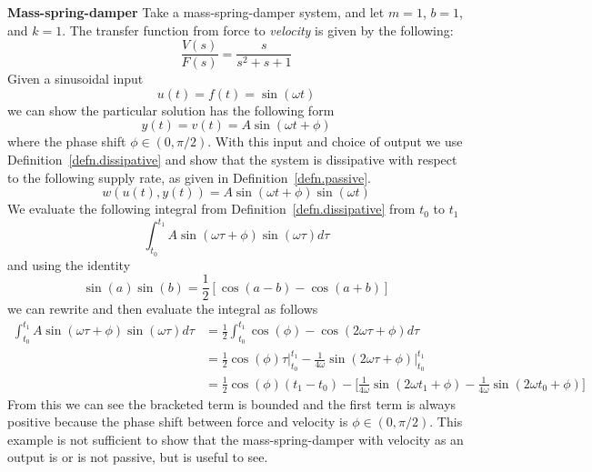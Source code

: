\begin{example}
  \textbf{Mass-spring-damper}
  Take a mass-spring-damper system, and let $m=1$, $b=1$, and $k=1$.
  The transfer function from force to \textit{velocity} is given by the following:
  \begin{equation*}
    \frac{V(s)}{F(s)} = \frac{s}{s^{2}+s+1}
  \end{equation*}
  Given a sinusoidal input
  \begin{equation}
    \label{eqn.sinusoidalInput}
    u(t) = f(t) = \sin(\omega t)
  \end{equation}
  we can show the particular solution has the following form
  \begin{equation}
    \label{eqn.particularSolution}
    y(t) = v(t) = A\sin(\omega t + \phi)
  \end{equation}
  where the phase shift $\phi\in(0, \pi/2)$.
  With this input and choice of output we use Definition~\ref{defn.dissipative} and show that the system is dissipative with respect to the following supply rate, as given in Definition~\ref{defn.passive}.
  \begin{equation}
    \label{eqn.exSupplyRate}
    w(u(t),y(t)) = A\sin(\omega t + \phi)\sin(\omega t)
  \end{equation}
  We evaluate the following integral from Definition~\ref{defn.dissipative} from $t_{0}$ to $t_{1}$
  \begin{equation*}
    \int_{t_{0}}^{t_{1}} A\sin(\omega \tau + \phi)\sin(\omega \tau) d\tau
  \end{equation*}
  and using the identity
  \begin{equation*}
    \sin(a)\sin(b) = \frac{1}{2}\left[\cos(a-b) - \cos(a+b)\right]
  \end{equation*}
  we can rewrite and then evaluate the integral as follows
  \begin{equation}
    \label{eqn.evaluateIntegral}
    \begin{split}
      \int_{t_{0}}^{t_{1}} A\sin(\omega \tau + \phi)\sin(\omega \tau) d\tau
      &=
      \frac{1}{2} \int_{t_{0}}^{t_{1}} \cos(\phi) - \cos(2\omega\tau + \phi) d\tau \\
      &=
      \frac{1}{2}\cos(\phi)\tau\biggr|_{t_{0}}^{t_{1}} - \frac{1}{4\omega}\sin(2\omega\tau + \phi)\biggr|_{t_{0}}^{t_{1}} \\
      &=
      \frac{1}{2}\cos(\phi)(t_{1}-t_{0}) -\biggr[\frac{1}{4\omega}\sin(2\omega t_{1} + \phi) - \frac{1}{4\omega}\sin(2\omega t_{0} + \phi)\biggr]
    \end{split}
  \end{equation}
  From this we can see the bracketed term is bounded and the first term is always positive because the phase shift between force and velocity is $\phi\in(0, \pi/2)$.
  This example is not sufficient to show that the mass-spring-damper with velocity as an output is or is not passive, but is useful to see.


\end{example}
